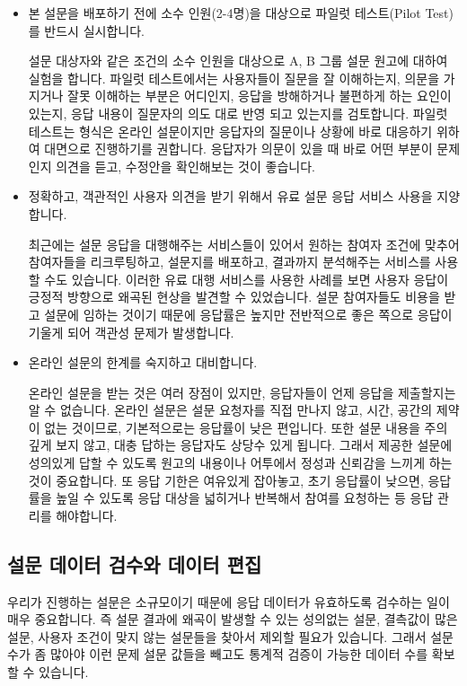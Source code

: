 \documentclass[
  letterpaper,
]{book}
\begin{document}
\begin{itemize}
\item
  본 설문을 배포하기 전에 소수 인원(2-4명)을 대상으로 파일럿
  테스트(Pilot Test)를 반드시 실시합니다.

  설문 대상자와 같은 조건의 소수 인원을 대상으로 A, B 그룹 설문 원고에
  대하여 실험을 합니다. 파일럿 테스트에서는 사용자들이 질문을 잘
  이해하는지, 의문을 가지거나 잘못 이해하는 부분은 어디인지, 응답을
  방해하거나 불편하게 하는 요인이 있는지, 응답 내용이 질문자의 의도 대로
  반영 되고 있는지를 검토합니다. 파일럿 테스트는 형식은 온라인
  설문이지만 응답자의 질문이나 상황에 바로 대응하기 위하여 대면으로
  진행하기를 권합니다. 응답자가 의문이 있을 때 바로 어떤 부분이 문제인지
  의견을 듣고, 수정안을 확인해보는 것이 좋습니다.
\item
  정확하고, 객관적인 사용자 의견을 받기 위해서 유료 설문 응답 서비스
  사용을 지양합니다.

  최근에는 설문 응답을 대행해주는 서비스들이 있어서 원하는 참여자 조건에
  맞추어 참여자들을 리크루팅하고, 설문지를 배포하고, 결과까지 분석해주는
  서비스를 사용할 수도 있습니다. 이러한 유료 대행 서비스를 사용한 사례를
  보면 사용자 응답이 긍정적 방향으로 왜곡된 현상을 발견할 수 있었습니다.
  설문 참여자들도 비용을 받고 설문에 임하는 것이기 때문에 응답률은
  높지만 전반적으로 좋은 쪽으로 응답이 기울게 되어 객관성 문제가
  발생합니다.
\item
  온라인 설문의 한계를 숙지하고 대비합니다.

  온라인 설문을 받는 것은 여러 장점이 있지만, 응답자들이 언제 응답을
  제출할지는 알 수 없습니다. 온라인 설문은 설문 요청자를 직접 만나지
  않고, 시간, 공간의 제약이 없는 것이므로, 기본적으로는 응답률이 낮은
  편입니다. 또한 설문 내용을 주의 깊게 보지 않고, 대충 답하는 응답자도
  상당수 있게 됩니다. 그래서 제공한 설문에 성의있게 답할 수 있도록
  원고의 내용이나 어투에서 정성과 신뢰감을 느끼게 하는 것이 중요합니다.
  또 응답 기한은 여유있게 잡아놓고, 초기 응답률이 낮으면, 응답률을 높일
  수 있도록 응답 대상을 넓히거나 반복해서 참여를 요청하는 등 응답 관리를
  해야합니다.
\end{itemize}

\subsection{설문 데이터 검수와 데이터
편집}\label{uxc124uxbb38-uxb370uxc774uxd130-uxac80uxc218uxc640-uxb370uxc774uxd130-uxd3b8uxc9d1}

우리가 진행하는 설문은 소규모이기 때문에 응답 데이터가 유효하도록
검수하는 일이 매우 중요합니다. 즉 설문 결과에 왜곡이 발생할 수 있는
성의없는 설문, 결측값이 많은 설문, 사용자 조건이 맞지 않는 설문들을
찾아서 제외할 필요가 있습니다. 그래서 설문 수가 좀 많아야 이런 문제 설문
값들을 빼고도 통계적 검증이 가능한 데이터 수를 확보할 수 있습니다.
\end{document}
